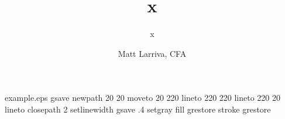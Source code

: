 \begin{filecontents*}{example.eps}
gsave
newpath
  20 20 moveto
  20 220 lineto
  220 220 lineto
  220 20 lineto
closepath
2 setlinewidth
gsave
  .4 setgray fill
grestore
stroke
grestore
\end{filecontents*}

\RequirePackage{fix-cm}
\documentclass{svjour3}                     %
\smartqed  %
\usepackage{graphicx}


\usepackage{natbib}
\usepackage{csvsimple}
\usepackage{breakcites}
\usepackage{caption}
\usepackage{blindtext}
\usepackage{amsmath}
\usepackage{float}
\usepackage{graphicx}
\usepackage{geometry}
\usepackage{longtable,array}
\usepackage{subfig}
\usepackage{graphicx}
\usepackage{url}
\usepackage{pdflscape}
\usepackage [english]{babel}
\usepackage [autostyle, english = american]{csquotes}


\title{x}
\date{}
\subtitle{x}
\author{Matt Larriva, CFA         %
}




\maketitle

